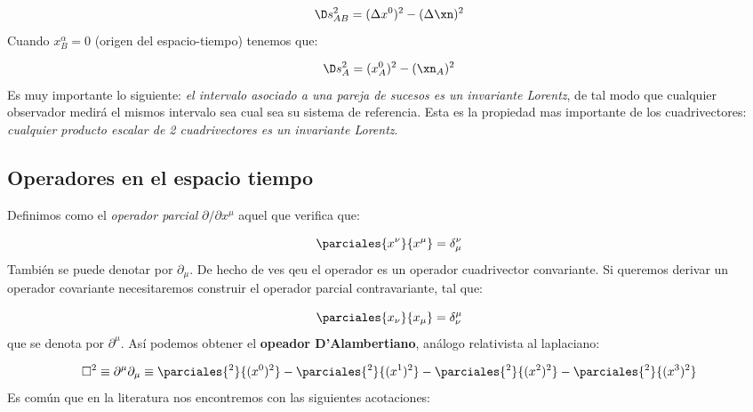 \begin{equation}
\D s_{AB}^2 =  (\Delta x^{0})^2 - (\Delta \xn)^2
\end{equation}
Cuando $x_{B}^\alpha = 0$ (origen del espacio-tiempo) tenemos que:

\begin{equation}
\D s_A^2 =  (x_A^0)^2 - (\xn_A)^2
\end{equation}
Es muy importante lo siguiente: \textit{el intervalo asociado a una pareja de sucesos es un invariante Lorentz}, de tal modo que cualquier observador medirá el mismos intervalo sea cual sea su sistema de referencia. Esta es la propiedad mas importante de los cuadrivectores: \textit{cualquier producto escalar de 2 cuadrivectores es un invariante Lorentz}. \\

\subsection*{Operadores en el espacio tiempo}

Definimos como el \textit{operador parcial} $\partial / \partial x^{\mu}$ aquel que verifica que:

\begin{equation}
\parciales{x^{\nu}}{x^{\mu}} = \delta_{\mu}^{\nu}
\end{equation}
También se puede denotar por $\partial_\mu$. De hecho de ves qeu el operador es un operador cuadrivector convariante. Si queremos derivar un operador covariante necesitaremos construir el operador parcial contravariante, tal que:

\begin{equation}
\parciales{x_{\nu}}{x_{\mu}} = \delta^{\mu}_{\nu}
\end{equation}
que se denota por $\partial^{\mu}$. Así podemos obtener el \textbf{opeador D'Alambertiano}, análogo relativista al laplaciano:

\begin{equation}
\square^2 \equiv \partial^\mu \partial_\mu \equiv  \parciales{^2}{(x^0)^2} -\parciales{^2}{(x^1)^2} - \parciales{^2}{(x^2)^2}  - \parciales{^2}{(x^3)^2} 
\end{equation}
Es común que en la literatura nos encontremos con las siguientes acotaciones:

